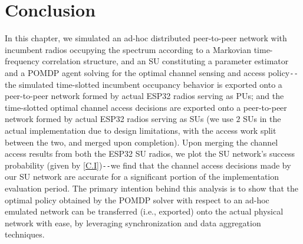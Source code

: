\section{Conclusion}\label{D.III}
In this chapter, we simulated an ad-hoc distributed peer-to-peer network with incumbent radios occupying the spectrum according to a Markovian time-frequency correlation structure, and an SU constituting a parameter estimator and a POMDP agent solving for the optimal channel sensing and access policy\texttt{-{}-}the simulated time-slotted incumbent occupancy behavior is exported onto a peer-to-peer network formed by actual ESP32 radios serving as PUs; and the time-slotted optimal channel access decisions are exported onto a peer-to-peer network formed by actual ESP32 radios serving as SUs (we use $2$ SUs in the actual implementation due to design limitations, with the access work split between the two, and merged upon completion). Upon merging the channel access results from both the ESP32 SU radios, we plot the SU network's success probability (given by \eqref{C.I})\texttt{-{}-}we find that the channel access decisions made by our SU network are accurate for a significant portion of the implementation evaluation period. The primary intention behind this analysis is to show that the optimal policy obtained by the POMDP solver with respect to an ad-hoc emulated network can be transferred (i.e., exported) onto the actual physical network with ease, by leveraging synchronization and data aggregation techniques.